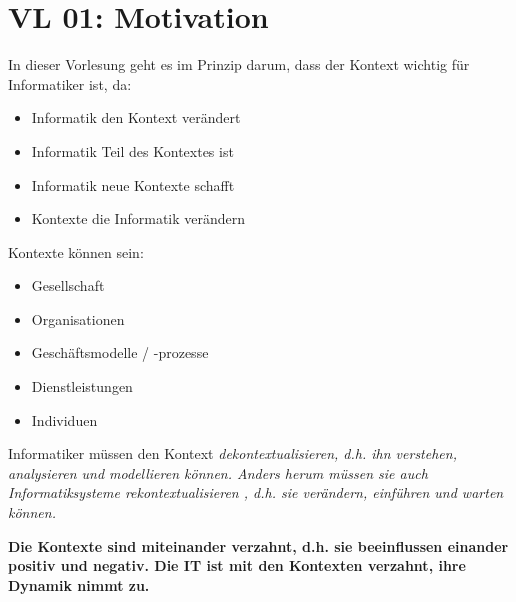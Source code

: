 \section{VL 01: Motivation}

In dieser Vorlesung geht es im Prinzip darum, dass der Kontext wichtig für Informatiker ist, da:
\begin{itemize}
	\item Informatik den Kontext verändert
	\item Informatik Teil des Kontextes ist
	\item Informatik neue Kontexte schafft
	\item Kontexte die Informatik verändern
\end{itemize}

Kontexte können sein:
\begin{itemize}
	\item Gesellschaft
	\item Organisationen
	\item Geschäftsmodelle / -prozesse
	\item Dienstleistungen
	\item Individuen
\end{itemize}

Informatiker müssen den Kontext \em dekontextualisieren\em, d.h. ihn \em verstehen, analysieren und modellieren \em können. Anders herum müssen sie auch Informatiksysteme \em rekontextualisieren \em, d.h. sie \em verändern, einführen und warten \em können.

{\large \textbf{Die Kontexte sind miteinander verzahnt, d.h. sie beeinflussen einander positiv und negativ. Die IT ist mit den Kontexten verzahnt, ihre Dynamik nimmt zu.}}
